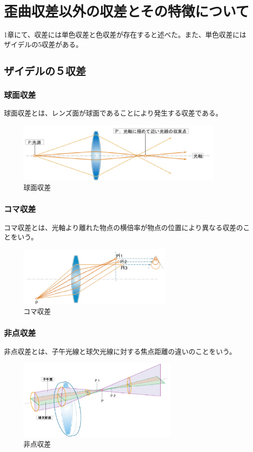 \section{歪曲収差以外の収差とその特徴について}
1章にて、収差には単色収差と色収差が存在すると述べた。また、単色収差にはザイデルの5収差がある。
\subsection{ザイデルの５収差}
\subsubsection{球面収差}
球面収差とは、レンズ面が球面であることにより発生する収差である。
\begin{figure}[h]
	\centering
	\includegraphics[height=30mm]{image/kyumen.png.eps}
	\caption{球面収差\ \cite{cite1}}
	\label{caption1}
\end{figure}

\subsubsection{コマ収差}
コマ収差とは、光軸より離れた物点の横倍率が物点の位置により異なる収差のことをいう。
\begin{figure}[h]
	\centering
	\includegraphics[height=30mm]{image/koma.png.eps}
	\caption{コマ収差\ \cite{cite1}}
	\label{caption1}
\end{figure}

\subsubsection{非点収差}
非点収差とは、子午光線と球欠光線に対する焦点距離の違いのことをいう。
\begin{figure}[h]
	\centering
	\includegraphics[height=40mm]{image/hiten.png.eps}
	\caption{非点収差}
	\label{caption1}
\end{figure}


